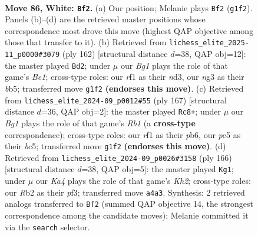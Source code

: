\documentclass[11pt]{article}
\begin{document}
\clearpage

\begin{figure}[p]\centering
\begin{subfigure}{0.46\textwidth}\centering
\resizebox{\linewidth}{!}{%
\newchessgame
\chessboard[
  setfen={8/8/4k2p/3pp1b1/K6p/6n1/1R6/5rB1 w - - 6 86},
  showmover=false,
  pgfstyle=straightmove, color=movearrow, markmove={g1-f2}
]}
\caption{}
\end{subfigure}\hfill
\begin{subfigure}{0.46\textwidth}\centering
\resizebox{\linewidth}{!}{%
\newchessgame
\chessboard[
  setfen={8/8/p1k1K2R/Pbp5/8/3n4/8/4B3 w - - 41 82},
  showmover=false,
  pgfstyle=straightmove, color=movearrow, markmove={e1-d2}
]}
\caption{}
\end{subfigure}
\\[4pt]
\begin{subfigure}{0.46\textwidth}\centering
\resizebox{\linewidth}{!}{%
\newchessgame
\chessboard[
  setfen={1r6/8/1PKP2k1/2B5/6p1/8/8/5R2 b - - 3 84},
  showmover=false,
  pgfstyle=straightmove, color=movearrow, markmove={b8-c8}
]}
\caption{}
\end{subfigure}\hfill
\begin{subfigure}{0.46\textwidth}\centering
\resizebox{\linewidth}{!}{%
\newchessgame
\chessboard[
  setfen={8/8/6p1/5k1p/R3b2P/3n1p2/7K/8 w - - 0 84},
  showmover=false,
  pgfstyle=straightmove, color=movearrow, markmove={h2-g1}
]}
\caption{}
\end{subfigure}
\caption{\textbf{Move 86, White: \texttt{Bf2}.} (a) Our position; Melanie plays \texttt{Bf2} (\texttt{g1f2}). Panels (b)--(d) are the retrieved master positions whose correspondence most drove this move (highest QAP objective among those that transfer to it). (b) Retrieved from \texttt{lichess\_elite\_2025-11\_p0000\#3079} (ply 162) [structural distance $d$=38, QAP obj=12]: the master played \texttt{Bd2}; under $\mu$ our \emph{Bg1} plays the role of that game's \emph{Be1}; cross-type roles: our \emph{r}f1 as their \emph{n}d3, our \emph{n}g3 as their \emph{b}b5; transferred move \texttt{g1f2} \textbf{(endorses this move)}. (c) Retrieved from \texttt{lichess\_elite\_2024-09\_p0012\#55} (ply 167) [structural distance $d$=36, QAP obj=2]: the master played \texttt{Rc8+}; under $\mu$ our \emph{Bg1} plays the role of that game's \emph{Rb1} (a \textbf{cross-type} correspondence); cross-type roles: our \emph{r}f1 as their \emph{p}b6, our \emph{p}e5 as their \emph{b}c5; transferred move \texttt{g1f2} \textbf{(endorses this move)}. (d) Retrieved from \texttt{lichess\_elite\_2024-09\_p0026\#3158} (ply 166) [structural distance $d$=38, QAP obj=5]: the master played \texttt{Kg1}; under $\mu$ our \emph{Ka4} plays the role of that game's \emph{Kh2}; cross-type roles: our \emph{R}b2 as their \emph{p}f3; transferred move \texttt{a4a3}. Synthesis: 2 retrieved analogs transferred to \texttt{Bf2} (summed QAP objective 14, the strongest correspondence among the candidate moves); Melanie committed it via the \texttt{search} selector.}
\label{fig:thought-m170}
\end{figure}
\end{document}

